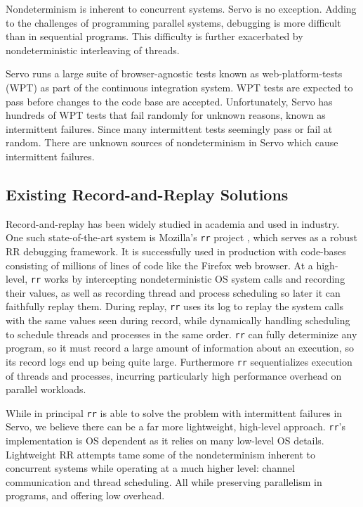 Nondeterminism is inherent to concurrent systems. Servo is no exception. Adding to
the challenges of programming parallel systems, debugging is more difficult than in
sequential programs. This difficulty is further exacerbated by nondeterministic
interleaving of threads.

Servo runs a large suite of browser-agnostic tests known as web-platform-tests (WPT)
as part of the continuous integration system. WPT tests are expected to pass before
changes to the code base are accepted. Unfortunately, Servo has hundreds of WPT tests that
fail randomly for unknown reasons, known as intermittent failures. Since many intermittent
tests seemingly pass or fail at random. There are unknown sources of nondeterminism in
Servo which cause intermittent failures.

\subsection{Existing Record-and-Replay Solutions}
Record-and-replay has been widely studied in academia and used in industry. One
such state-of-the-art system is Mozilla's \texttt{rr} project \cite{rr}, which serves
as a robust RR debugging framework. It is successfully used in production
with code-bases consisting of millions of lines of code like the Firefox web browser.
At a high-level, \texttt{rr} works by intercepting nondeterministic OS system calls and recording
their values, as well as recording thread and process scheduling so later it can faithfully
replay them. During replay, \texttt{rr} uses its log to replay the system calls with the same
values seen during record, while dynamically handling scheduling to schedule threads
and processes in the same order. \texttt{rr} can fully determinize any program,
so it must record a large amount of information about an execution, so its record logs
end up being quite large. Furthermore \texttt{rr} sequentializes execution of threads and
processes, incurring particularly high performance overhead on parallel workloads.

While in principal \texttt{rr} is able to solve the problem with intermittent failures in Servo,
we believe there can be a far more lightweight, high-level approach.
\texttt{rr}'s implementation is OS dependent as it relies on many low-level OS details.
Lightweight RR attempts tame some of the nondeterminism inherent to concurrent systems
while operating at a much higher level: channel communication and thread scheduling.
All while preserving parallelism in programs, and offering low overhead.

